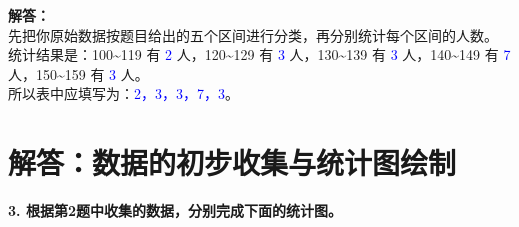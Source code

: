 \documentclass[12pt, a4paper]{ctexrep}
\begin{document}
\vspace{0.6cm}

{\small\color{gray}
\textbf{解答：}\\
先把你原始数据按题目给出的五个区间进行分类，再分别统计每个区间的人数。\\
统计结果是：100\textasciitilde119 有 \textcolor{blue}{2} 人，120\textasciitilde129 有 \textcolor{blue}{3} 人，130\textasciitilde139 有 \textcolor{blue}{3} 人，140\textasciitilde149 有 \textcolor{blue}{7} 人，150\textasciitilde159 有 \textcolor{blue}{3} 人。\\
所以表中应填写为：\textcolor{blue}{2，3，3，7，3}。
}


\newpage

\section{解答：数据的初步收集与统计图绘制}

\vspace{0.4cm}

\noindent\textbf{3. 根据第2题中收集的数据，分别完成下面的统计图。}

\vspace{0.6cm}
\end{document}
